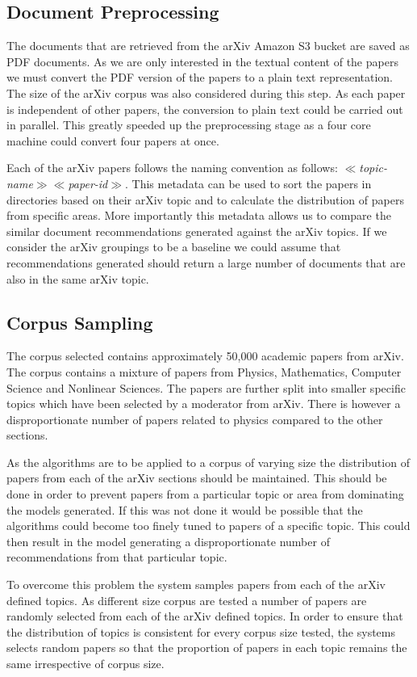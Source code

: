 \subsection{Document Preprocessing}
The documents that are retrieved from the arXiv Amazon S3 bucket are saved as PDF documents.
As we are only interested in the textual content of the papers we must convert the PDF version of the papers to a plain text representation.
The size of the arXiv corpus was also considered during this step.
As each paper is independent of other papers, the conversion to plain text could be carried out in parallel.
This greatly speeded up the preprocessing stage as a four core machine could convert four papers at once.

Each of the arXiv papers follows the naming convention as follows: \textit{$\ll$topic-name$\gg\ll$paper-id$\gg$}.
This metadata can be used to sort the papers in directories based on their arXiv topic and to calculate the distribution of papers from specific areas.
More importantly this metadata allows us to compare the similar document recommendations generated against the arXiv topics.
If we consider the arXiv groupings to be a baseline we could assume that recommendations generated should return a large number of documents that are also in the same arXiv topic.

\subsection{Corpus Sampling}
The corpus selected contains approximately 50,000 academic papers from arXiv.
The corpus contains a mixture of papers from Physics, Mathematics, Computer Science and Nonlinear Sciences.
The papers are further split into smaller specific topics which have been selected by a moderator from arXiv.
There is however a disproportionate number of papers related to physics compared to the other sections.

As the algorithms are to be applied to a corpus of varying size the distribution of papers from each of the arXiv sections should be maintained.
This should be done in order to prevent papers from a particular topic or area from dominating the models generated.
If this was not done it would be possible that the algorithms could become too finely tuned to papers of a specific topic.
This could then result in the model generating a disproportionate number of recommendations from that particular topic.

To overcome this problem the system samples papers from each of the arXiv defined topics.
As different size corpus are tested a number of papers are randomly selected from each of the arXiv defined topics.
In order to ensure that the distribution of topics is consistent for every corpus size tested, the systems selects random papers so that the proportion of papers in each topic remains the same irrespective of corpus size.

